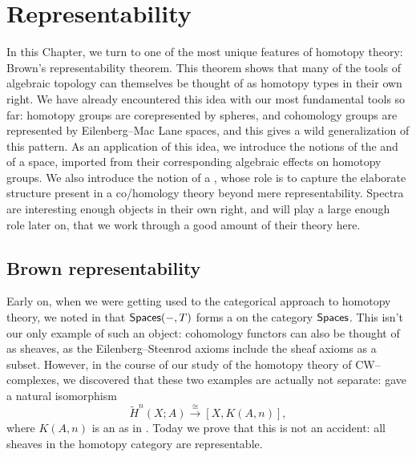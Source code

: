 
\chapter{Representability}\label{RepChap}

In this Chapter, we turn to one of the most unique features of homotopy theory: Brown's representability theorem.
This theorem shows that many of the tools of algebraic topology can themselves be thought of as homotopy types in their own right.
We have already encountered this idea with our most fundamental tools so far: homotopy groups are corepresented by spheres, and cohomology groups are represented by Eilenberg--Mac Lane spaces, and this gives a wild generalization of this pattern.
As an application of this idea, we introduce the notions of the  and  of a space, imported from their corresponding algebraic effects on homotopy groups.
We also introduce the notion of a , whose role is to capture the elaborate structure present in a co/homology theory beyond mere representability.
Spectra are interesting enough objects in their own right, and will play a large enough role later on, that we work through a good amount of their theory here.





\section{Brown representability}\label{BrownRepSec}

Early on, when we were getting used to the categorical approach to homotopy theory, we noted in  that $\mathsf{Spaces}(-, T)$ forms a  on the category $\mathsf{Spaces}$.
This isn't our only example of such an object: cohomology functors can also be thought of as sheaves, as the Eilenberg--Steenrod axioms include the sheaf axioms as a subset.
However, in the course of our study of the homotopy theory of CW--complexes, we discovered that these two examples are actually not separate:  gave a natural isomorphism \[\widetilde H^n(X; A) \xrightarrow\cong [X, K(A, n)],\] where $K(A, n)$ is an  as in .
Today we prove that this is not an accident: all sheaves in the homotopy category are representable.

